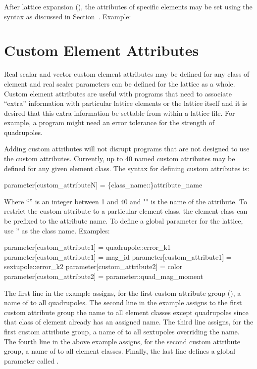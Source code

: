 {{{After lattice expansion (), the attributes of specific elements may be set using the
syntax as discussed in Section~. Example:

\section{Custom Element Attributes}
\label{s:cust.att}

Real scalar and vector custom element attributes may be defined for any class of element and real
scaler parameters can be defined for the lattice as a whole.  Custom element attributes are useful
with programs that need to associate ``extra'' information with particular lattice elements or the
lattice itself and it is desired that this extra information be settable from within a lattice
file. For example, a program might need an error tolerance for the strength of quadrupoles.

Adding custom attributes will not disrupt programs that are not designed to use the custom
attributes. Currently, up to 40 named custom attributes may be defined for any given element
class. The syntax for defining custom attributes is:
\begin{example}
  parameter[custom_attributeN] = \{class_name::\}attribute_name
\end{example}
Where ``'' is an integer between 1 and 40 and "" is the name of the
attribute. To restrict the custom attribute to a particular element class, the element class can be
prefixed to the attribute name. To define a global parameter for the lattice, use ''
as the class name.
Examples:
\begin{example}
  parameter[custom_attribute1] = quadrupole::error_k1
  parameter[custom_attribute1] = mag_id
  parameter[custom_attribute1] = sextupole::error_k2
  parameter[custom_attribute2] = color
  parameter[custom_attribute2] = parameter::quad_mag_moment
\end{example}
The first line in the example assigns, for the first custom attribute group
(), a name of  to all quadrupoles. The second line in the example
assigns to the first custom attribute group the name  to all element classes except
quadrupoles since that class of element already has an assigned name. The third line assigns, for
the first custom attribute group, a name of  to all sextupoles overriding the
 name. The fourth line in the above example assigns, for the second custom attribute
group, a name of  to all element classes. Finally, the last line defines a global parameter
called .

}}}
